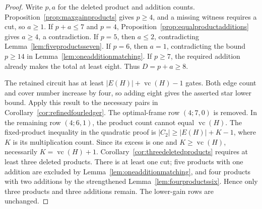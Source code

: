 \documentclass[11pt]{article}
\newcommand{\vc}{\operatorname{vc}}
\theoremstyle{definition}
\theoremstyle{remark}
\begin{document}
\begin{proof}
Write $p,a$ for the deleted product and addition counts. Proposition~\ref{prop:maxgainproducts} gives $p\ge4$, and a missing witness requires a cut, so $a\ge1$. If $p+a\le7$ and $p=4$, Proposition~\ref{prop:equalproductadditions} gives $a\ge4$, a contradiction. If $p=5$, then $a\le2$, contradicting Lemma~\ref{lem:fiveproductsseven}. If $p=6$, then $a=1$, contradicting the bound $p\ge14$ in Lemma~\ref{lem:oneadditionmatching}. If $p\ge7$, the required addition already makes the total at least eight. Thus $D=p+a\ge8$.

The retained circuit has at least $|E(H)|+\vc(H)-1$ gates. Both edge count and cover number increase by four, so adding eight gives the asserted star lower bound. Apply this result to the necessary pairs in Corollary~\ref{cor:refinedfourledger}. The optimal-frame row $(4;7,0)$ is removed. In the remaining row $(4;6,1)$, the product count cannot equal $\vc(H)$. The fixed-product inequality in the quadratic proof is $|C_2|\ge|E(H)|+K-1$, where $K$ is its multiplication count. Since its excess is one and $K\ge\vc(H)$, necessarily $K=\vc(H)+1$. Corollary~\ref{cor:threedeletedproducts} requires at least three deleted products. There is at least one cut; five products with one addition are excluded by Lemma~\ref{lem:oneadditionmatching}, and four products with two additions by the strengthened Lemma~\ref{lem:fourproductssix}. Hence only three products and three additions remain. The lower-gain rows are unchanged.
\end{proof}
\end{document}
